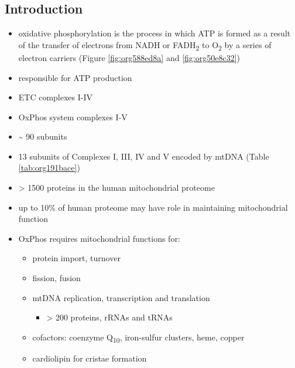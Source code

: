 \documentclass{scrartcl}
\begin{document}
\subsection{Introduction}
\label{sec:org9827c35}
\begin{itemize}
\item oxidative phosphorylation is the process in which ATP is formed as a
result of the transfer of electrons from NADH or FADH\textsubscript{2} to O\textsubscript{2} by a
series of electron carriers (Figure \ref{fig:org588ed8a} and \ref{fig:org50e8c32})
\item responsible for ATP production
\item ETC complexes I-IV
\item OxPhos system complexes I-V
\item \textasciitilde{} 90 subunits
\item 13 subunits of Complexes I, III, IV and V encoded by mtDNA (Table \ref{tab:org191bace})
\item \textgreater{} 1500 proteins in the human mitochondrial proteome
\item up to 10\% of human proteome may have role in maintaining mitochondrial function
\item OxPhos requires mitochondrial functions for:
\begin{itemize}
\item protein import, turnover
\item fission, fusion
\item mtDNA replication, transcription and translation
\begin{itemize}
\item \textgreater{} 200 proteins, rRNAs and tRNAs
\end{itemize}
\item cofactors: coenzyme Q\textsubscript{10}, iron-sulfur clusters, heme, copper
\item cardiolipin for cristae formation
\end{itemize}


\end{itemize}
\end{document}
